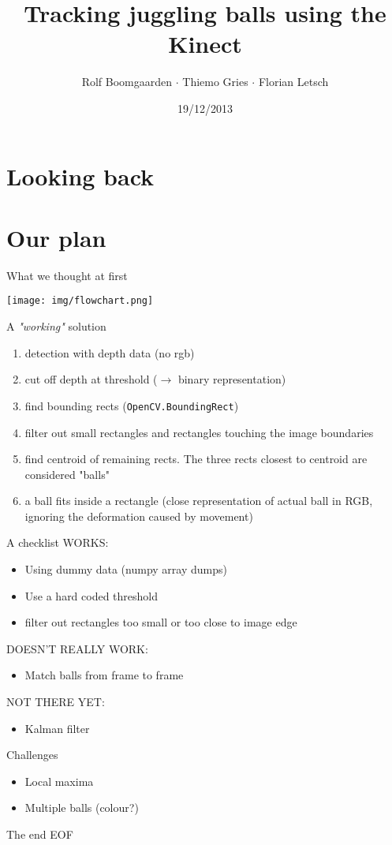 \documentclass{beamer}
\title{Tracking juggling balls using the Kinect}
\author[Rolf $\cdot$ Thiemo $\cdot$ Flo]{Rolf Boomgaarden $\cdot$ Thiemo Gries $\cdot$ Florian Letsch}
\institute{Universität Hamburg}
\date{19/12/2013}
\begin{document}
\frame
{
\titlepage
}
\section{Looking back}

\section{Our plan}
\begin{frame}{What we thought at first}
\begin{center}\texttt{[image: img/flowchart.png]}\end{center}
\end{frame}

\begin{frame}{A \textit{"working"} solution}
\begin{enumerate}
	\item detection with depth data (no rgb)
	\item cut off depth at threshold ($\rightarrow$ binary representation)
	\item find bounding rects (\lstinline{OpenCV.BoundingRect})
	\item filter out small rectangles and rectangles touching the image boundaries
	\item find centroid of remaining rects. The three rects closest to centroid are considered "balls"
	\item a ball fits inside a rectangle (close representation of actual ball in RGB, ignoring the deformation caused by movement)
\end{enumerate}
\end{frame}


\begin{frame}{A checklist}
WORKS:

\begin{itemize}
\item Using dummy data (numpy array dumps)\\
\item Use a hard coded threshold\\
\item filter out rectangles too small or too close to image edge
\end{itemize}

DOESN'T REALLY WORK:

\begin{itemize}
 \item Match balls from frame to frame
\end{itemize}

NOT THERE YET:
\begin{itemize}
 \item Kalman filter
\end{itemize}

\end{frame}



\begin{frame}{Challenges}
\begin{itemize}
	\item Local maxima
	\item Multiple balls (colour?)
\end{itemize}
\end{frame}

\begin{frame}{The end}
EOF
\end{frame}
\end{document}
